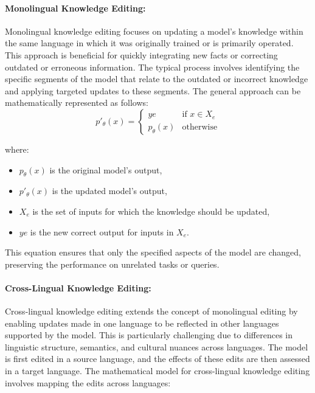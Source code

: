 \paragraph{Monolingual Knowledge Editing:} Monolingual knowledge editing focuses on updating a model's knowledge within the same language in which it was originally trained or is primarily operated. This approach is beneficial for quickly integrating new facts or correcting outdated or erroneous information. The typical process involves identifying the specific segments of the model that relate to the outdated or incorrect knowledge and applying targeted updates to these segments. The general approach can be mathematically represented as follows:
\begin{equation}
p'_{\theta}(x) = 
\begin{cases} 
	ye & \text{if } x \in X_e \\
	p_{\theta}(x) & \text{otherwise}
\end{cases}
\end{equation}

where:
\begin{itemize}
	\item \(p_{\theta}(x)\) is the original model's output,
	\item \(p'_{\theta}(x)\) is the updated model's output,
	\item \(X_e\) is the set of inputs for which the knowledge should be updated,
	\item \(ye\) is the new correct output for inputs in \(X_e\).
\end{itemize}

This equation ensures that only the specified aspects of the model are changed, preserving the performance on unrelated tasks or queries.

\paragraph{Cross-Lingual Knowledge Editing:} Cross-lingual knowledge editing extends the concept of monolingual editing by enabling updates made in one language to be reflected in other languages supported by the model. This is particularly challenging due to differences in linguistic structure, semantics, and cultural nuances across languages. The model is first edited in a source language, and the effects of these edits are then assessed in a target language. The mathematical model for cross-lingual knowledge editing involves mapping the edits across languages:

